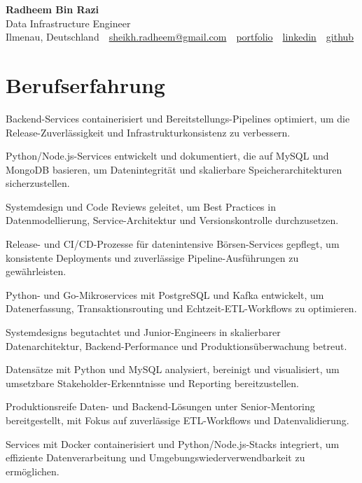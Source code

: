 \documentclass[11pt,a4paper]{resume}
\makeatletter
\newcommand{\Portfolio}{https://radheem.github.io/my-cv}
\newcommand{\PortfolioText}{portfolio}
\newcommand{\GitHub}{https://github.com/radheem}
\newcommand{\LinkedIn}{https://www.linkedin.com/in/radheem-razi}
\newcommand{\Email}{sheikh.radheem@gmail.com}
\makeatother
\begin{document}
\clearpage
{}

\begin{center}
  {\huge\bfseries Radheem Bin Razi}\\[3pt]
  {\large Data Infrastructure Engineer}\\[6pt]
  \small
  Ilmenau, Deutschland \,\textbar\,
  \href{mailto:\Email}{\Email} \,\textbar\,
  \href{\Portfolio}{\PortfolioText} \,\textbar\,
  \href{\LinkedIn}{linkedin} \,\textbar\,
  \href{\GitHub}{github}
\end{center}
\vspace{2pt}

\section{Berufserfahrung}

\bullets
  \item Backend-Services containerisiert und Bereitstellungs-Pipelines optimiert, um die Release-Zuverlässigkeit und Infrastrukturkonsistenz zu verbessern.
  \item Python/Node.js-Services entwickelt und dokumentiert, die auf MySQL und MongoDB basieren, um Datenintegrität und skalierbare Speicherarchitekturen sicherzustellen.
  \item Systemdesign und Code Reviews geleitet, um Best Practices in Datenmodellierung, Service-Architektur und Versionskontrolle durchzusetzen.
\bulletsend
\vspace{3pt}
\bullets
  \item Release- und CI/CD-Prozesse für datenintensive Börsen-Services gepflegt, um konsistente Deployments und zuverlässige Pipeline-Ausführungen zu gewährleisten.
  \item Python- und Go-Mikroservices mit PostgreSQL und Kafka entwickelt, um Datenerfassung, Transaktionsrouting und Echtzeit-ETL-Workflows zu optimieren.
  \item Systemdesigns begutachtet und Junior-Engineers in skalierbarer Datenarchitektur, Backend-Performance und Produktionsüberwachung betreut.
\bulletsend
\vspace{3pt}
\bullets
  \item Datensätze mit Python und MySQL analysiert, bereinigt und visualisiert, um umsetzbare Stakeholder-Erkenntnisse und Reporting bereitzustellen.
  \item Produktionsreife Daten- und Backend-Lösungen unter Senior-Mentoring bereitgestellt, mit Fokus auf zuverlässige ETL-Workflows und Datenvalidierung.
  \item Services mit Docker containerisiert und Python/Node.js-Stacks integriert, um effiziente Datenverarbeitung und Umgebungswiederverwendbarkeit zu ermöglichen.
\bulletsend
\vspace{3pt}
\end{document}

